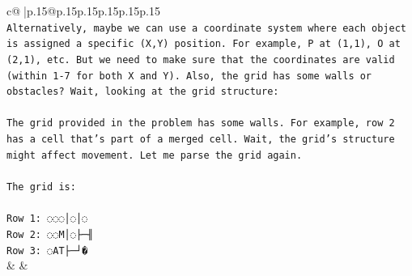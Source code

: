 \documentclass{article}
\begin{document}
{\begin{supertabular}{c@{$\;$}|p{.15\linewidth}@{}p{.15\linewidth}p{.15\linewidth}p{.15\linewidth}p{.15\linewidth}p{.15\linewidth}}
{{{\\ 
\texttt{Alternatively, maybe we can use a coordinate system where each object is assigned a specific (X,Y) position. For example, P at (1,1), O at (2,1), etc. But we need to make sure that the coordinates are valid (within 1{-}7 for both X and Y). Also, the grid has some walls or obstacles? Wait, looking at the grid structure:} \\
\\ 
\texttt{The grid provided in the problem has some walls. For example, row 2 has a cell that's part of a merged cell. Wait, the grid's structure might affect movement. Let me parse the grid again.} \\
\\ 
\texttt{The grid is:} \\
\\ 
\texttt{Row 1: ◌◌◌│◌│◌} \\
\texttt{Row 2: ◌◌M│◌├─╢} \\
\texttt{Row 3: ◌AT├─┘�} \\
            }
        }
    }
    & & \\ \\


\end{supertabular}}
\end{document}
